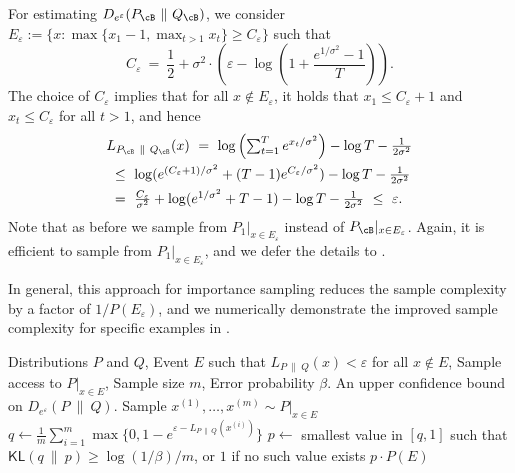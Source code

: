 \documentclass[twoside]{article}
\theoremstyle{definition}
\newcommand{\eps}{\varepsilon}
\newcommand{\prn}[1]{\left ( #1 \right )}
\newcommand{\Deps}{D_{e^{\eps}}}
\newcommand{\KL}{\mathsf{KL}}
\newcommand{\PB}{P_{\cB}}
\newcommand{\QB}{Q_{\cB}}
\begin{document}
For estimating $\Deps(\PB ~\|~ \QB)$, we consider $E_\eps := \{ x : \max\{ x_1 - 1, \max_{t > 1} x_t\} \ge C_\eps \}$ such that
\[\textstyle
C_{\eps} ~=~ \frac{1}{2} + \sigma^2 \cdot \prn{\eps - \log\prn{1 + \frac{e^{1/\sigma^2} - 1}{T}}}.
\]
The choice of $C_{\eps}$ implies that for all $x \notin E_{\eps}$, it holds that $x_1 \le C_{\eps} + 1$ and $x_t \le C_{\eps}$ for all $t > 1$, and hence
\begin{align*}
&\textstyle L_{\PB ~\|~ \QB}(x) ~=~ \log\prn{\sum_{t=1}^T e^{x_t / \sigma^2}} - \log T - \frac{1}{2\sigma^2}\\
&\textstyle~\le~ \log(e^{(C_{\eps}+1) / \sigma^2} + (T-1) e^{C_{\eps} / \sigma^2}) - \log T - \frac{1}{2\sigma^2}\\
&\textstyle~=~ \frac{C_\eps}{\sigma^2} + \log(e^{1 / \sigma^2} + T-1) - \log T - \frac{1}{2\sigma^2} ~\le~ \eps.
\end{align*}
Note that as before we sample from $P_1|_{x \in E_{\eps}}$ instead of $\PB|_{x \in E_{\eps}}$. Again, it is efficient to sample from $P_1|_{x \in E_{\eps}}$, and we defer the details to .

In general, this approach for importance sampling reduces the sample complexity by a factor of $1 / P(E_\eps)$, and we numerically demonstrate the improved sample complexity for specific examples in .

\begin{algorithm}[t]
\caption{Monte Carlo Estimation of $\Deps(P ~\|~ Q)$ with Importance Sampling.}
\label{alg:importance-mce}
\begin{algorithmic}
\REQUIRE Distributions $P$ and $Q$,
\STATE{} Event $E$ such that $L_{P ~\|~ Q}(x) < \eps$ for all $x \notin E$,
 Sample access to $P|_{x \in E}$,
\STATE{} Sample size $m$, Error probability $\beta$.
\ENSURE An upper confidence bound on $\Deps(P ~\|~ Q)$.
\STATE Sample $x^{(1)}, \ldots, x^{(m)} \sim P|_{x \in E}$
\STATE $q \gets \frac1m \sum_{i=1}^m \max\{ 0, 1 - e^{\eps - L_{P ~\|~ Q}(x^{(i)})}\}$
\STATE $p \gets$ smallest value in $[q, 1]$ such that $\KL(q ~\|~ p) \ge \log(1/\beta) / m$, or $1$ if no such value exists
\RETURN $p \cdot P(E)$
\end{algorithmic}
\end{algorithm}
\end{document}
